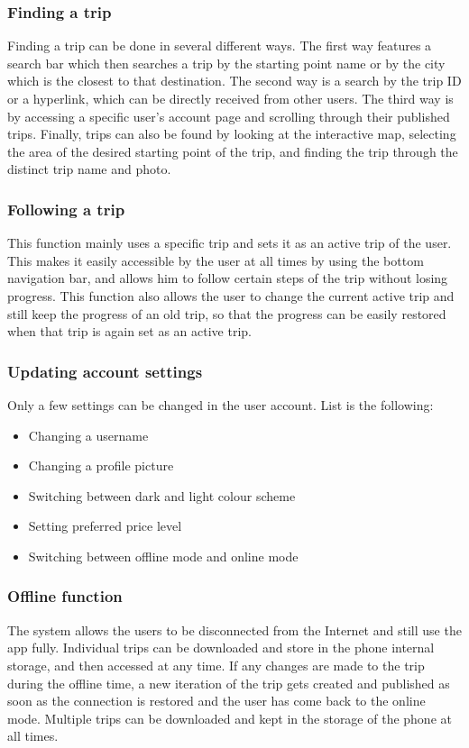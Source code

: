 \subsubsection{Finding a trip}
\hspace{\parindent}Finding a trip can be done in several different ways. The first way features a search bar which then searches a trip by the starting point name or by the city which is the closest to that destination. The second way is a search by the trip ID or a hyperlink, which can be directly received from other users. The third way is by accessing a specific user's account page and scrolling through their published trips. Finally, trips can also be found by looking at the interactive map, selecting the area of the desired starting point of the trip, and finding the trip through the distinct trip name and photo.  
\subsubsection{Following a trip}
\hspace{\parindent}This function mainly uses a specific trip and sets it as an active trip of the user. This makes it easily accessible by the user at all times by using the bottom navigation bar, and allows him to follow certain steps of the trip without losing progress. This function also allows the user to change the current active trip and still keep the progress of an old trip, so that the progress can be easily restored when that trip is again set as an active trip.
\subsubsection{Updating account settings}
\hspace{\parindent}Only a few settings can be changed in the user account. List is the following:
\begin{itemize}
\item Changing a username
\item Changing a profile picture
\item Switching between dark and light colour scheme
\item Setting preferred price level
\item Switching between offline mode and online mode
\end{itemize}
\subsubsection{Offline function}
\hspace{\parindent}The system allows the users to be disconnected from the Internet and still use the app fully. Individual trips can be downloaded and store in the phone internal storage, and then accessed at any time. If any changes are made to the trip during the offline time, a new iteration of the trip gets created and published as soon as the connection is restored and the user has come back to the online mode. Multiple trips can be downloaded and kept in the storage of the phone at all times.  
